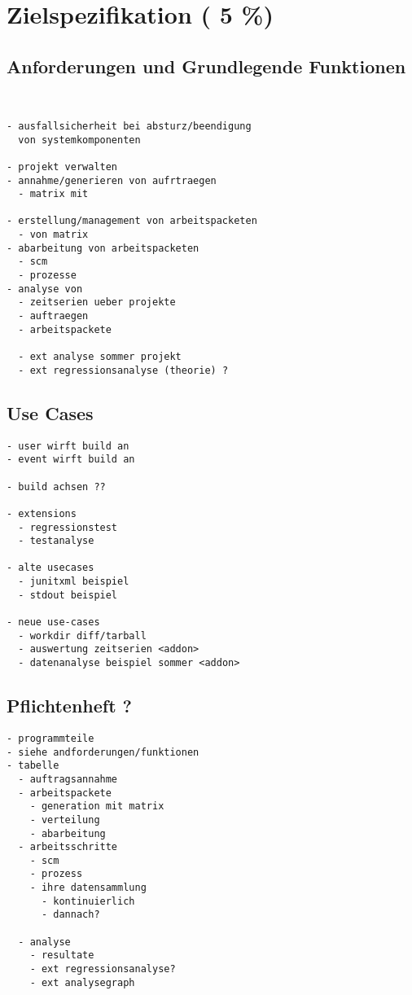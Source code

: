 \chapter{Zielspezifikation ( 5 \%)}





\section{Anforderungen und Grundlegende Funktionen}

\begin{verbatim}


- ausfallsicherheit bei absturz/beendigung
  von systemkomponenten

- projekt verwalten
- annahme/generieren von aufrtraegen
  - matrix mit

- erstellung/management von arbeitspacketen
  - von matrix
- abarbeitung von arbeitspacketen
  - scm
  - prozesse
- analyse von
  - zeitserien ueber projekte
  - auftraegen
  - arbeitspackete

  - ext analyse sommer projekt
  - ext regressionsanalyse (theorie) ?
\end{verbatim}

\section{Use Cases}


\begin{verbatim}
- user wirft build an
- event wirft build an

- build achsen ??

- extensions
  - regressionstest
  - testanalyse

- alte usecases
  - junitxml beispiel
  - stdout beispiel

- neue use-cases
  - workdir diff/tarball
  - auswertung zeitserien <addon>
  - datenanalyse beispiel sommer <addon>
\end{verbatim}

\section{Pflichtenheft ?}

\begin{verbatim}
- programmteile
- siehe andforderungen/funktionen
- tabelle
  - auftragsannahme
  - arbeitspackete
    - generation mit matrix
    - verteilung
    - abarbeitung
  - arbeitsschritte
    - scm
    - prozess
    - ihre datensammlung
      - kontinuierlich
      - dannach?

  - analyse
    - resultate
    - ext regressionsanalyse?
    - ext analysegraph
\end{verbatim}

